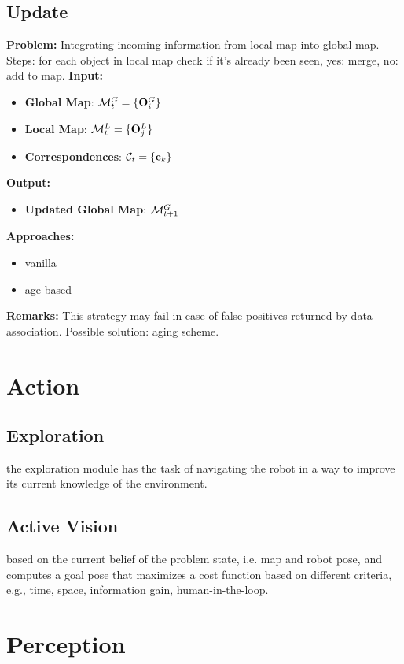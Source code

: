 \documentclass{article}
\begin{document}
	\subsection{Update} 
	
	{\bf Problem: } Integrating incoming information from local map into global map. Steps: for each object in local map check if it's already been seen, yes: merge, no: add to map. 
	\noindent
	{\bf Input: }
	\begin{itemize}
		\item {\bf Global Map}: $\mathcal{M}_t^G = \{ \mathbf{O}_i^G \}$
		\item {\bf Local Map}: $\mathcal{M}_t^L = \{ \mathbf{O}_j^L \}$
		\item {\bf Correspondences}: $\mathcal{C}_t = \{ \mathbf{c}_k\}$		
	\end{itemize}
	\noindent
	{\bf Output: }
	\begin{itemize}
		\item {\bf Updated Global Map}: $\mathcal{M}_{t+1}^G$
	\end{itemize}
	\noindent
	{\bf Approaches: }
	\begin{itemize}
		\item vanilla
		\item age-based
	\end{itemize}
	\noindent
	{\bf Remarks: } This strategy may fail in case of false positives returned by data association. Possible solution:  aging scheme.
	
		
	\section{Action}
	
	\subsection{Exploration} the exploration module has the task of navigating the robot in a way to improve its current knowledge of the environment. 
	
	\subsection{Active Vision} based on the current belief of the problem state, i.e. map and robot pose, and computes a goal pose that maximizes a cost function based on different criteria, e.g., time, space, information gain, human-in-the-loop.
		
	\section{Perception}
\end{document}
